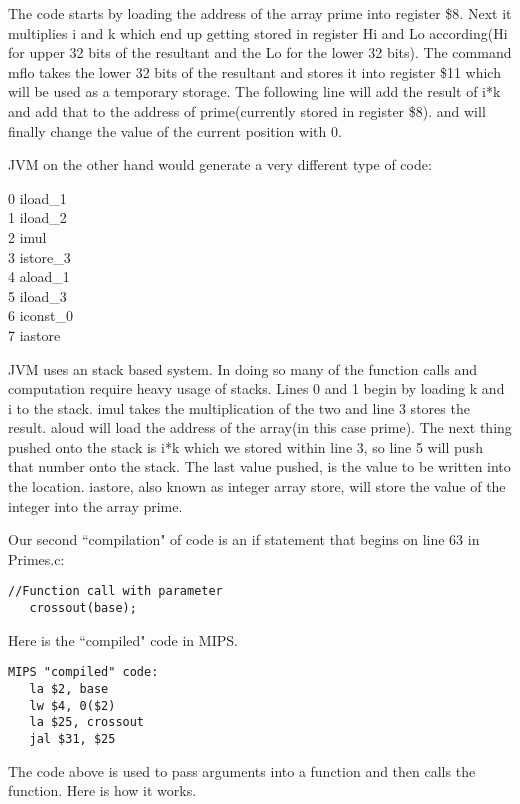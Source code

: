 \documentclass[11pt]{article}
\newenvironment{myindentpar}[1]
{\begin{list}{} 
{\setlength{\leftmargin}{#1}}\item[]}
{\end{list}}
\begin{document}
The code starts by loading the address of the array prime into register \$8. Next it multiplies i and k which end up getting stored in register Hi and Lo according(Hi for upper 32 bits of the resultant and the Lo for the lower 32 bits). The command mflo takes the lower 32 bits of the resultant and stores it into register \$11 which will be used as a temporary storage. The following line will add the result of i*k and add that to the address of prime(currently stored in register \$8). and will finally change the value of the current position with 0.

JVM on the other hand would generate a very different type of code:

\begin{myindentpar}{.4 in}
0 iload\_1
\\1  iload\_2
\\2  imul
\\3  istore\_3
\\4  aload\_1
\\5  iload\_3
\\6  iconst\_0
\\7  iastore
\end{myindentpar}

JVM uses an stack based system. In doing so many of the function calls and computation require heavy usage of stacks. Lines 0 and 1 begin by loading k and i to the stack. imul takes the multiplication of the two and line 3 stores the result. aloud will load the address of the array(in this case prime). The next thing pushed onto the stack is i*k which we stored within line 3, so line 5 will push that number onto the stack. The last value pushed, is the value to be written into the location. iastore, also known as integer array store, will store the value of the integer into the array prime.


Our second ``compilation" of code is an if statement that begins on line 63 in Primes.c:
\begin{verbatim}
//Function call with parameter
   crossout(base);
\end{verbatim}

Here is the ``compiled" code in MIPS.

\begin{verbatim}
MIPS "compiled" code:
   la $2, base
   lw $4, 0($2)
   la $25, crossout
   jal $31, $25
\end{verbatim}

The code above is used to pass arguments into a function and then calls the function. Here is how it works. 
\end{document}
